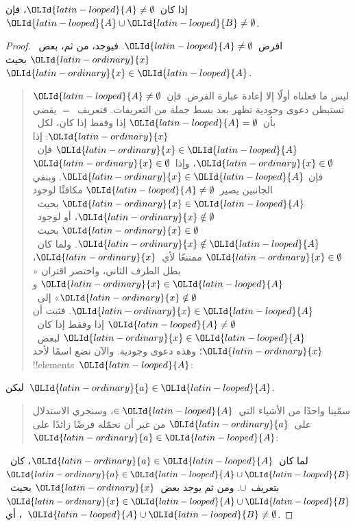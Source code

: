 \documentclass[../../../include/open-logic-section]{subfiles}
\begin{document}
\begin{prop}
إذا كان~${\OLId{latin-looped}{A}} \neq \emptyset$، فإن~${\OLId{latin-looped}{A}} \cup {\OLId{latin-looped}{B}} \neq \emptyset$.
\end{prop}

\begin{proof}
  افرض~${\OLId{latin-looped}{A}} \neq \emptyset$. فيوجد، من ثم، بعض~${\OLId{latin-ordinary}{x}}$ بحيث~${\OLId{latin-ordinary}{x}} \in {\OLId{latin-looped}{A}}$.
  \begin{quote}
    ليس ما فعلناه أولًا إلا إعادة عبارة الفرض. فإن~${\OLId{latin-looped}{A}} \neq \emptyset$
    تستبطن دعوى وجودية تظهر بعد بسط جملة من التعريفات. فتعريف~$=$
    يقضي بأن~${\OLId{latin-looped}{A}} = \emptyset$ إذا وفقط إذا كان، لكل~${\OLId{latin-ordinary}{x}}$: إذا
    ${\OLId{latin-ordinary}{x}} \in {\OLId{latin-looped}{A}}$ فإن~${\OLId{latin-ordinary}{x}} \in \emptyset$، وإذا~${\OLId{latin-ordinary}{x}} \in \emptyset$ فإن
    ${\OLId{latin-ordinary}{x}} \in {\OLId{latin-looped}{A}}$. وبنفي الجانبين يصير~${\OLId{latin-looped}{A}} \neq \emptyset$ مكافئًا لوجود
    ${\OLId{latin-ordinary}{x}} \in {\OLId{latin-looped}{A}}$ بحيث~${\OLId{latin-ordinary}{x}} \notin \emptyset$، أو لوجود~${\OLId{latin-ordinary}{x}} \in \emptyset$
    بحيث~${\OLId{latin-ordinary}{x}} \notin {\OLId{latin-looped}{A}}$. ولما كان~${\OLId{latin-ordinary}{x}} \in \emptyset$ ممتنعًا لأي~${\OLId{latin-ordinary}{x}}$،
    بطل الطرف الثاني، واختصر اقتران «${\OLId{latin-ordinary}{x}} \in {\OLId{latin-looped}{A}}$ و
    ${\OLId{latin-ordinary}{x}} \notin \emptyset$» إلى~${\OLId{latin-ordinary}{x}} \in {\OLId{latin-looped}{A}}$. فثبت أن
    ${\OLId{latin-looped}{A}} \neq \emptyset$ إذا وفقط إذا كان~${\OLId{latin-ordinary}{x}} \in {\OLId{latin-looped}{A}}$ لبعض~${\OLId{latin-ordinary}{x}}$؛ وهذه
    دعوى وجودية. والآن نضع اسمًا لأحد !!{element}s~${\OLId{latin-looped}{A}}$:
  \end{quote}
  ليكن~${\OLId{latin-ordinary}{a}} \in {\OLId{latin-looped}{A}}$.
  \begin{quote}
    سمّينا واحدًا من الأشياء التي~$\in {\OLId{latin-looped}{A}}$، وسنجري الاستدلال على~${\OLId{latin-ordinary}{a}}$
    من غير أن نحمّله فرضًا زائدًا على~${\OLId{latin-ordinary}{a}} \in {\OLId{latin-looped}{A}}$:
  \end{quote}
  لما كان~${\OLId{latin-ordinary}{a}} \in {\OLId{latin-looped}{A}}$، كان~${\OLId{latin-ordinary}{a}} \in {\OLId{latin-looped}{A}} \cup {\OLId{latin-looped}{B}}$ بتعريف~$\cup$. ومن ثم
  يوجد بعض~${\OLId{latin-ordinary}{x}}$ بحيث~${\OLId{latin-ordinary}{x}} \in {\OLId{latin-looped}{A}} \cup {\OLId{latin-looped}{B}}$، أي~${\OLId{latin-looped}{A}} \cup {\OLId{latin-looped}{B}} \neq \emptyset$.

\end{proof}
\end{document}
